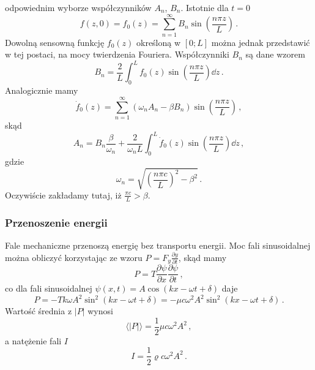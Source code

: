 \documentclass[../main.tex]{subfiles}
\begin{document}
        odpowiednim wyborze współczynników \(A_n\), \(B_n\). Istotnie dla \(t=0\)
        \begin{equation*}
            f(z,0)=f_0(z)=\sum_{n=1}^\infty B_n\sin\left(\frac{n\pi z}{L}\right)\,.
        \end{equation*}
        Dowolną sensowną funkcję \(f_0(z)\) określoną w \([0;L]\) można jednak przedstawić w tej
        postaci, na mocy twierdzenia Fouriera. Współczynniki \(B_n\) są dane wzorem
        \begin{equation*}
            B_n=\frac{2}{L}\int_0^Lf_0(z)\sin\left(\frac{n\pi z}{L}\right)\dd{z}\,.
        \end{equation*}
        Analogicznie mamy
        \begin{equation*}
            \dot{f}_0(z)=\sum_{n=1}^\infty (\omega_nA_n-\beta B_n)\sin\left(\frac{n\pi z}{L}\right)\,,
        \end{equation*}
        skąd
        \begin{equation*}
            A_n=B_n\frac{\beta}{\omega_n}+\frac{2}{\omega_nL}\int_0^L\dot{f}_0(z)\sin\left(\frac{n\pi z}{L}\right)\dd{z}\,,
        \end{equation*}
        gdzie
        \begin{equation*}
            \omega_n=\sqrt{\left(\frac{n\pi c}{L}\right)^2-\beta^2}\,.
        \end{equation*}
        Oczywiście zakładamy tutaj, iż \(\frac{\pi c}{L}>\beta\).
        \subsubsection{Przenoszenie energii}
        Fale mechaniczne przenoszą energię bez transportu energii. Moc fali sinusoidalnej można
        obliczyć korzystając ze wzoru \(P=F_y\frac{\partial y}{\partial t}\), skąd mamy
        \begin{equation*}
            P=T\frac{\partial \psi}{\partial x}\frac{\partial \psi}{\partial t}\,,
        \end{equation*}
        co dla fali sinusoidalnej \(\psi(x,t)=A\cos(kx-\omega t+\delta)\) daje
        \begin{equation*}
            P=-Tk\omega A^2\sin^2(kx-\omega t+\delta)=-\mu c\omega^2 A^2\sin^2(kx-\omega t+\delta)\,.
        \end{equation*}
        Wartość średnia z \(|P|\) wynosi
        \begin{equation*}
            \langle |P|\rangle =\frac{1}{2}\mu c\omega^2 A^2\,,
        \end{equation*}
        a natężenie fali \(I\)
        \begin{equation*}
            I=\frac{1}{2}\varrho c\omega^2A^2\,.
        \end{equation*}
\end{document}
